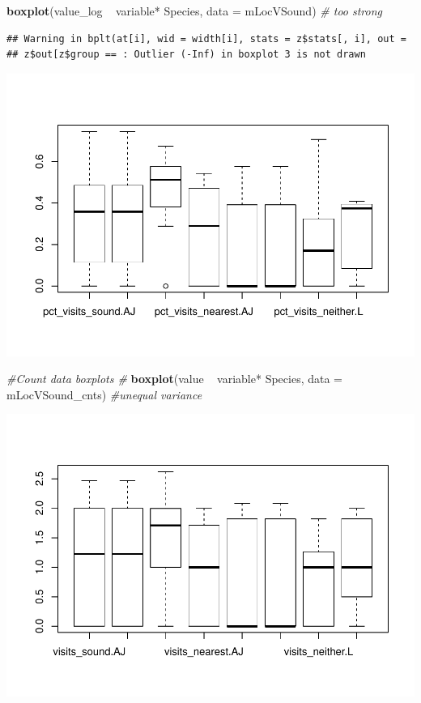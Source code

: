 \documentclass[]{article}
\newenvironment{Shaded}{\begin{snugshade}}{\end{snugshade}}
\newcommand{\KeywordTok}[1]{\textcolor[rgb]{0.13,0.29,0.53}{\textbf{{#1}}}}
\newcommand{\DataTypeTok}[1]{\textcolor[rgb]{0.13,0.29,0.53}{{#1}}}
\newcommand{\StringTok}[1]{\textcolor[rgb]{0.31,0.60,0.02}{{#1}}}
\newcommand{\CommentTok}[1]{\textcolor[rgb]{0.56,0.35,0.01}{\textit{{#1}}}}
\newcommand{\NormalTok}[1]{{#1}}
\begin{document}
\begin{Shaded}
\begin{Highlighting}[]
\KeywordTok{boxplot}\NormalTok{(value_log ~}\StringTok{  }\NormalTok{variable*}\StringTok{ }\NormalTok{Species, }\DataTypeTok{data =} \NormalTok{mLocVSound) }\CommentTok{# too strong}
\end{Highlighting}
\end{Shaded}

\begin{verbatim}
## Warning in bplt(at[i], wid = width[i], stats = z$stats[, i], out =
## z$out[z$group == : Outlier (-Inf) in boxplot 3 is not drawn
\end{verbatim}

\includegraphics{Sensory_learning_files/figure-latex/unnamed-chunk-17-4.pdf}

\begin{Shaded}
\begin{Highlighting}[]
\CommentTok{#Count data boxplots #}
\KeywordTok{boxplot}\NormalTok{(value ~}\StringTok{  }\NormalTok{variable*}\StringTok{ }\NormalTok{Species, }\DataTypeTok{data =} \NormalTok{mLocVSound_cnts) }\CommentTok{#unequal variance}
\end{Highlighting}
\end{Shaded}

\includegraphics{Sensory_learning_files/figure-latex/unnamed-chunk-17-5.pdf}
\end{document}
